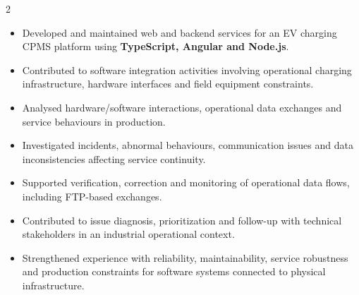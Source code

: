 \documentclass[8pt,a4paper,ragged2e,withhyper]{altacv}
\begin{document}



\makecvheader

\vspace{-0.3cm}


\begin{paracol}{2}



\begin{itemize}
\item Developed and maintained web and backend services for an EV charging CPMS platform using \textbf{TypeScript, Angular and Node.js}.
\item Contributed to software integration activities involving operational charging infrastructure, hardware interfaces and field equipment constraints.
\item Analysed hardware/software interactions, operational data exchanges and service behaviours in production.
\item Investigated incidents, abnormal behaviours, communication issues and data inconsistencies affecting service continuity.
\item Supported verification, correction and monitoring of operational data flows, including FTP-based exchanges.
\item Contributed to issue diagnosis, prioritization and follow-up with technical stakeholders in an industrial operational context.
\item Strengthened experience with reliability, maintainability, service robustness and production constraints for software systems connected to physical infrastructure.
\end{itemize}

\divider



\end{paracol}
\end{document}
